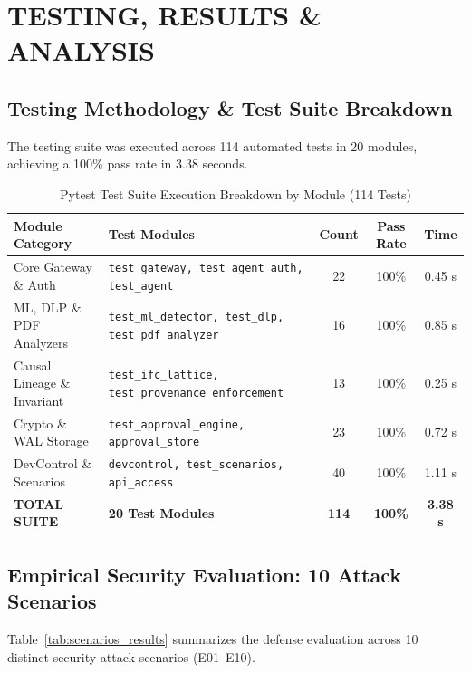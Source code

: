 \chapter{TESTING, RESULTS \& ANALYSIS}

\section{Testing Methodology \& Test Suite Breakdown}
The testing suite was executed across 114 automated tests in 20 modules, achieving a 100\% pass rate in 3.38 seconds.

\begin{table}[htbp]
\centering
\caption{Pytest Test Suite Execution Breakdown by Module (114 Tests)}
\label{tab:pytest_breakdown}
\begin{tabular}{p{4.2cm} p{4.5cm} c c c}
\toprule
\textbf{Module Category} & \textbf{Test Modules} & \textbf{Count} & \textbf{Pass Rate} & \textbf{Time} \\
\midrule
Core Gateway \& Auth & \texttt{test\_gateway, test\_agent\_auth, test\_agent} & 22 & 100\% & 0.45 s \\
ML, DLP \& PDF Analyzers & \texttt{test\_ml\_detector, test\_dlp, test\_pdf\_analyzer} & 16 & 100\% & 0.85 s \\
Causal Lineage \& Invariant & \texttt{test\_ifc\_lattice, test\_provenance\_enforcement} & 13 & 100\% & 0.25 s \\
Crypto \& WAL Storage & \texttt{test\_approval\_engine, approval\_store} & 23 & 100\% & 0.72 s \\
DevControl \& Scenarios & \texttt{devcontrol, test\_scenarios, api\_access} & 40 & 100\% & 1.11 s \\
\midrule
\textbf{TOTAL SUITE} & \textbf{20 Test Modules} & \textbf{114} & \textbf{100\%} & \textbf{3.38 s} \\
\bottomrule
\end{tabular}
\end{table}

\section{Empirical Security Evaluation: 10 Attack Scenarios}
Table~\ref{tab:scenarios_results} summarizes the defense evaluation across 10 distinct security attack scenarios (E01--E10).

